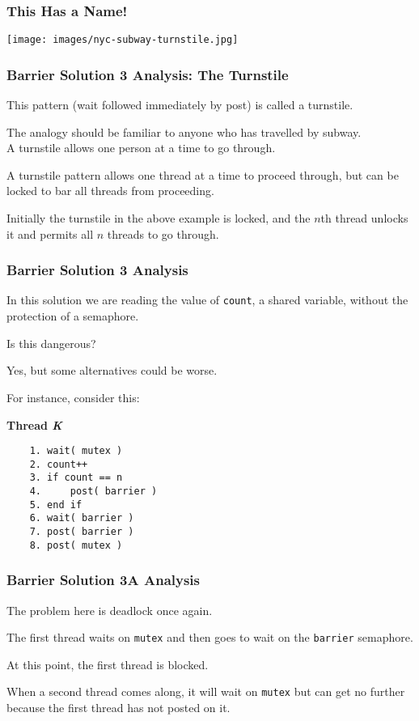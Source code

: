 \begin{frame}
	\frametitle{This Has a Name!}
	\begin{center}
		\texttt{[image: images/nyc-subway-turnstile.jpg]}
	\end{center}

\end{frame}


\begin{frame}
	\frametitle{Barrier Solution 3 Analysis: The Turnstile}

	This pattern (wait followed immediately by post) is called a \alert{turnstile}.

	The analogy should be familiar to anyone who has travelled by subway.\\
	\quad A turnstile allows one person at a time to go through.

	A turnstile pattern allows one thread at a time to proceed through, but can be locked to bar all threads from proceeding.

	Initially the turnstile in the above example is locked, and the $n$th thread unlocks it and permits all $n$ threads to go through.

\end{frame}

\begin{frame}[fragile]
	\frametitle{Barrier Solution 3 Analysis}

	In this solution we are reading the value of \texttt{count}, a shared variable, without the protection of a semaphore.

	Is this dangerous?

	Yes, but some alternatives could be worse.

	For instance, consider this:

	\textbf{Thread \textit{K}}\vspace{-2em}
	\begin{verbatim}
	1. wait( mutex )
	2. count++
	3. if count == n
	4.     post( barrier )
	5. end if
	6. wait( barrier )
	7. post( barrier )
	8. post( mutex )
  	\end{verbatim}
	\vspace{-2em}

\end{frame}

\begin{frame}
	\frametitle{Barrier Solution 3A Analysis}

	The problem here is deadlock once again.

	The first thread waits on \texttt{mutex} and then goes to wait on the \texttt{barrier} semaphore.

	At this point, the first thread is blocked.

	When a second thread comes along, it will wait on \texttt{mutex} but can get no further because the first thread has not posted on it.


\end{frame}

